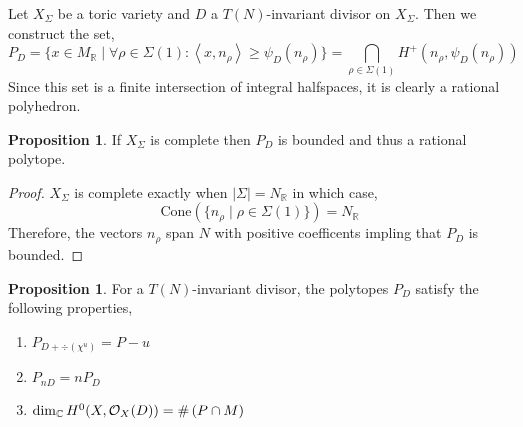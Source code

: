 \documentclass[12pt]{extarticle}
\newcommand{\R}{\mathbb{R}}
\newcommand{\C}{\mathbb{C}}
\theoremstyle{definition}
\newtheorem{proposition}[theorem]{Proposition}
\newenvironment{definition}[1][Definition:]{\begin{trivlist}
\item[\hskip \labelsep {\bfseries #1}]}{\end{trivlist}}
\newcommand{\inner}[2]{\left< #1, #2 \right>}
\begin{document}
\begin{definition}
Let $X_\Sigma$ be a toric variety and $D$ a $T(N)$-invariant divisor on $X_\Sigma$. Then we construct the set,
\[ P_D = \{ x \in M_\R \mid \forall \rho \in \Sigma(1) : \inner{x}{n_\rho} \ge \psi_D(n_\rho) \} = \bigcap_{\rho \in \Sigma(1)} H^+(n_\rho, \psi_D(n_\rho)) \]
Since this set is a finite intersection of integral halfspaces, it is clearly a rational polyhedron.
\end{definition}

\begin{proposition}
If $X_\Sigma$ is complete then $P_D$ is bounded and thus a rational polytope. 
\end{proposition}

\begin{proof}
$X_\Sigma$ is complete exactly when $|\Sigma| = N_\R$ in which case,
\[ \mathrm{Cone}(\{ n_\rho \mid \rho \in \Sigma(1) \}) = N_\R \]
Therefore, the vectors $n_\rho$ span $N$ with positive coefficents impling that $P_D$ is bounded.
\end{proof}

\begin{proposition}
For a $T(N)$-invariant divisor, the polytopes $P_D$ satisfy the following properties,
\begin{enumerate}
\item $P_{D + \div{(\chi^u)}} = P - u$
\item $P_{n D} = n P_D$
\item $\dim_\C H^0(X, \struct{X}(D)) = \# \left( P \cap M \right)$
\end{enumerate}
\end{proposition}
\end{document}
